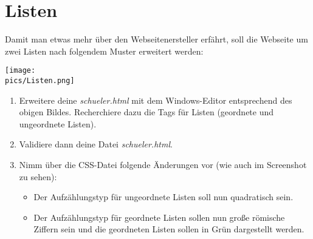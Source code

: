 \section{Listen}
Damit man etwas mehr über den Webseitenersteller erfährt, soll die Webseite um zwei Listen nach folgendem Muster erweitert werden:
\begin{minipage}[t]{\textwidth}
    \texttt{[image: \\pics/Listen.png]}
\end{minipage}

\begin{Exercise}[title=, label=Listen]
    \begin{enumerate}
        \item Erweitere deine \textit{schueler.html} mit dem Windows-Editor entsprechend des obigen Bildes. Recherchiere dazu die Tags für Listen (geordnete und ungeordnete Listen).
        \item Validiere dann deine Datei \textit{schueler.html}.
        \item Nimm über die CSS-Datei folgende Änderungen vor (wie auch im Screenshot zu sehen):
        \begin{itemize}
            \item Der Aufzählungstyp für ungeordnete Listen soll nun quadratisch sein.
            \item Der Aufzählungstyp für geordnete Listen sollen nun große römische Ziffern sein und die geordneten Listen sollen in Grün dargestellt werden.
        \end{itemize}
    \end{enumerate}
\end{Exercise}

